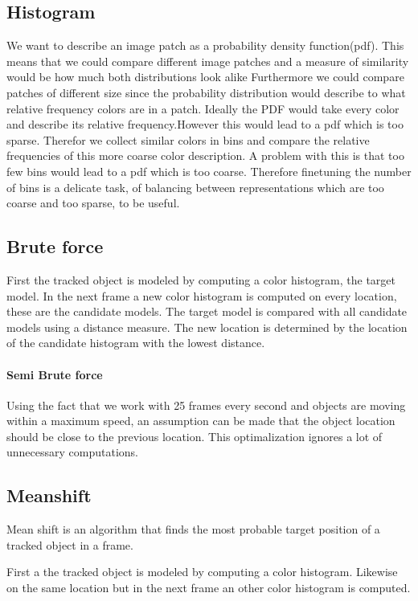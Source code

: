 \documentclass[a4paper,11pt]{article}
\begin{document}
	\subsection{Histogram}
		We want to describe an image patch as a probability density function(pdf). This means that we could compare different image patches and a measure of similarity would be how much both distributions look alike %
		Furthermore we could compare patches of different size since the probability distribution would describe to what relative frequency colors are in a patch.
		Ideally the PDF  would take every color and describe its relative frequency.However this would lead to a pdf which is too sparse. Therefor we collect similar colors in bins and compare the relative frequencies of this more coarse color description. A problem with this is that too few bins would lead to a pdf which is too coarse. Therefore finetuning the number of bins is a delicate task, of balancing between representations which are too coarse and too sparse, to be useful. 

	\subsection{Brute force}
		First the tracked object is modeled by computing a color histogram, the
		target model.
		In the next frame a new color histogram is computed on every location,
		these are the candidate models.
		The target model is compared with all candidate models using a distance
		measure. The new location is determined by the location of the candidate
		histogram with the lowest distance.
		
		\paragraph{Semi Brute force}
		Using the fact that we work with 25 frames every second and objects are moving
		within a maximum speed, an assumption can be made that the object
		location should be close to the previous location. This optimalization
		ignores a lot of unnecessary computations.

	
	\subsection{Meanshift}
		Mean shift is an algorithm that finds the most probable target position of a
		tracked object in a frame.

		First a the tracked object is modeled by computing a color histogram.
		Likewise on the same location but in the next frame an other color histogram is
		computed.
\end{document}
